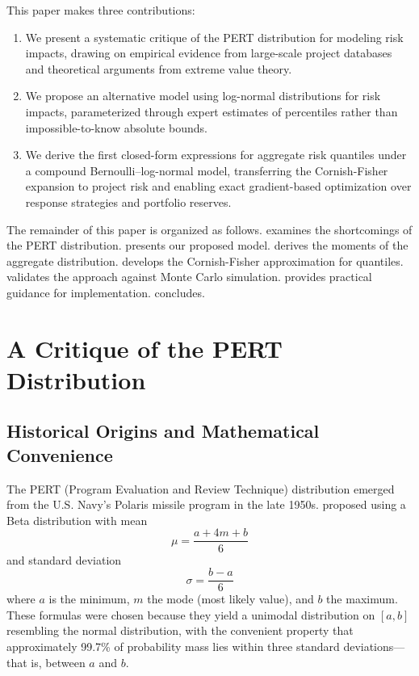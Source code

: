 \documentclass[12pt,a4paper]{article}
\theoremstyle{definition}
\theoremstyle{remark}
\begin{document}
This paper makes three contributions:

\begin{enumerate}
    \item We present a systematic critique of the PERT distribution for modeling risk impacts, drawing on empirical evidence from large-scale project databases and theoretical arguments from extreme value theory.
    
    \item We propose an alternative model using log-normal distributions for risk impacts, parameterized through expert estimates of percentiles rather than impossible-to-know absolute bounds.
    
    \item We derive the first closed-form expressions for aggregate risk quantiles under a compound Bernoulli--log-normal model, transferring the Cornish-Fisher expansion to project risk and enabling exact gradient-based optimization over response strategies and portfolio reserves.
\end{enumerate}

The remainder of this paper is organized as follows.  examines the shortcomings of the PERT distribution.  presents our proposed model.  derives the moments of the aggregate distribution.  develops the Cornish-Fisher approximation for quantiles.  validates the approach against Monte Carlo simulation.  provides practical guidance for implementation.  concludes.

\section{A Critique of the PERT Distribution}
\label{sec:critique_pert}

\subsection{Historical Origins and Mathematical Convenience}

The PERT (Program Evaluation and Review Technique) distribution emerged from the U.S. Navy's Polaris missile program in the late 1950s. \citet{Clark1962} proposed using a Beta distribution with mean
\begin{equation}
    \mu = \frac{a + 4m + b}{6}
\end{equation}
and standard deviation
\begin{equation}
    \sigma = \frac{b - a}{6}
\end{equation}
where $a$ is the minimum, $m$ the mode (most likely value), and $b$ the maximum. These formulas were chosen because they yield a unimodal distribution on $[a, b]$ resembling the normal distribution, with the convenient property that approximately 99.7\% of probability mass lies within three standard deviations—that is, between $a$ and $b$.
\end{document}
